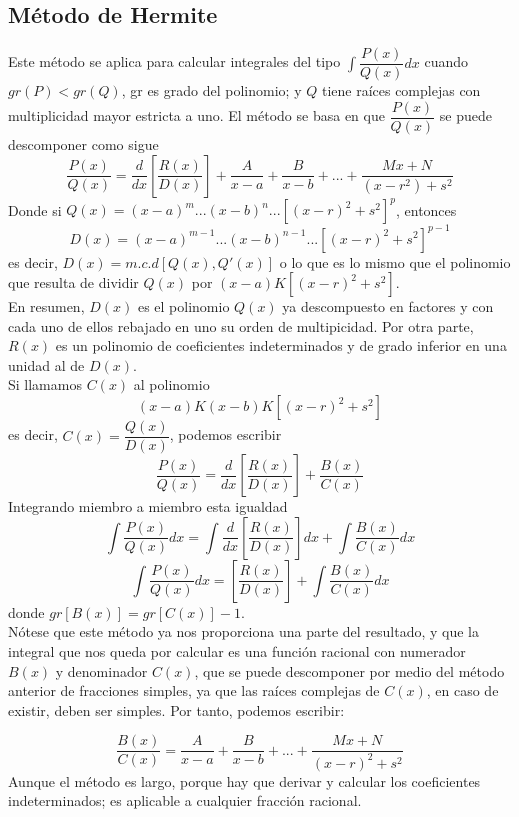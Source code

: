\documentclass[10pt,twoside]{SelfArx} %
\begin{document}
\subsection{Método de Hermite}
Este método se aplica para calcular integrales del tipo $ \int\dfrac{P(x)}{Q(x)}dx $ cuando $ gr(P)<gr(Q) $, gr es grado del polinomio; y $ Q $ tiene raíces complejas con multiplicidad mayor estricta a uno. El método se basa en que $ \dfrac{P(x)}{Q(x)} $ se puede descomponer como sigue
\begin{equation}
\dfrac{P(x)}{Q(x)}=\dfrac{d}{dx}\left [\dfrac{R(x)}{D(x)}\right ]+\dfrac{A}{x-a}+\dfrac{B}{x-b}+...+\dfrac{Mx+N}{(x-r^{2})+s^{2}}
\end{equation}
Donde si $ Q(x)=(x-a)^{m}...(x-b)^{n}...[(x-r)^{2}+s^{2}]^{p} $, entonces
\[ D(x)=(x-a)^{m-1}...(x-b)^{n-1}...[(x-r)^{2}+s^{2}]^{p-1} \]
es decir, $ D(x)=m.c.d[Q(x), Q'(x)] $ o lo que es lo mismo que el polinomio que resulta de dividir $ Q(x) $ por $ (x-a)K[(x-r)^{2}+s^{2}] $.\\
En resumen, $ D(x) $ es el polinomio $ Q(x) $ ya descompuesto en factores y con cada uno  de ellos rebajado en uno su orden de multipicidad. Por otra parte, $ R(x) $ es un polinomio de coeficientes indeterminados y de grado inferior en una unidad al de $ D(x) $.\\
Si llamamos $ C(x) $ al polinomio 
\[ (x-a)K(x-b)K[(x-r)^{2}+s^{2}] \]
es decir, $ C(x)=\dfrac{Q(x)}{D(x)} $, podemos escribir
\[ \dfrac{P(x)}{Q(x)}=\dfrac{d}{dx}\left [\dfrac{R(x)}{D(x)}\right ]+\dfrac{B(x)}{C(x)} \]
Integrando miembro a miembro esta igualdad
\begin{equation}
 \displaystyle\int \dfrac{P(x)}{Q(x)}dx=\int\dfrac{d}{dx}\left [\dfrac{R(x)}{D(x)}\right ]dx+\int\dfrac{B(x)}{C(x)}dx
\end{equation}
\begin{equation}
\displaystyle\int \dfrac{P(x)}{Q(x)}dx=\left [\dfrac{R(x)}{D(x)}\right ]+\int\dfrac{B(x)}{C(x)}dx
\end{equation}
donde $ gr[B(x)]=gr[C(x)]-1 $.\\
Nótese que este método ya nos proporciona una parte del resultado, y que la integral que nos queda por calcular es una función
racional con numerador $ B(x) $ y denominador $ C(x) $, que se puede descomponer
por medio del método anterior de fracciones simples, ya que las raíces
complejas de $ C(x) $, en caso de existir, deben ser simples. Por tanto, podemos
escribir: 

\[ 
\dfrac{B(x)}{C(x)}=\dfrac{A}{x-a}+\dfrac{B}{x-b}+...+\dfrac{Mx+N}{(x-r)^{2}+s^{2}}
 \]
Aunque el método es largo, porque hay que derivar y calcular los coeficientes indeterminados; es aplicable a cualquier fracción racional.
\end{document}
